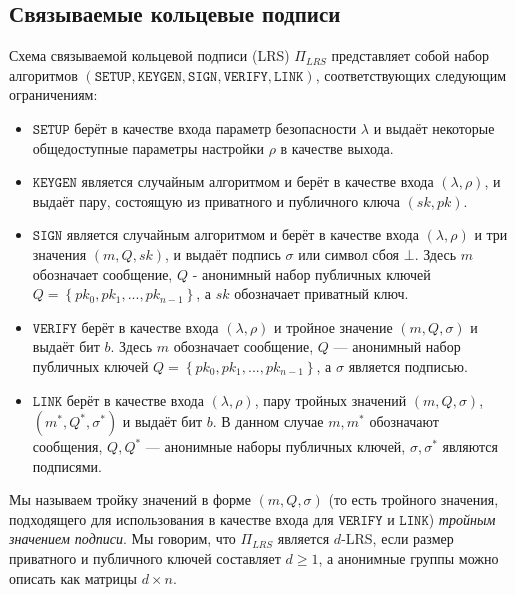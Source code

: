 \documentclass{llncs}
\begin{document}
\subsection{Связываемые кольцевые подписи}

\begin{definition}\label{def:lrs} Схема связываемой кольцевой подписи (LRS) $\Pi_{LRS}$ представляет собой набор алгоритмов $(\texttt{SETUP}, \texttt{KEYGEN}, \texttt{SIGN}, \texttt{VERIFY}, \texttt{LINK})$, соответствующих следующим ограничениям:
\begin{itemize}
\item $\texttt{SETUP}$ берёт в качестве входа параметр безопасности $\lambda$ и выдаёт некоторые общедоступные параметры настройки $\rho$ в качестве выхода.

\item $\texttt{KEYGEN}$ является случайным алгоритмом и берёт в качестве входа $(\lambda, \rho)$, и выдаёт пару, состоящую из приватного и публичного ключа $(sk, pk)$.

\item $\texttt{SIGN}$ является случайным алгоритмом и берёт в качестве входа $(\lambda, \rho)$ и три значения $(m, Q, sk)$, и выдаёт подпись $\sigma$ или символ сбоя $\bot$. Здесь $m$ обозначает сообщение, $Q$ - анонимный набор публичных ключей $Q = \left\{pk_0, pk_1, ..., pk_{n-1}\right\}$, а $sk$ обозначает приватный ключ.

\item $\texttt{VERIFY}$ берёт в качестве входа $(\lambda, \rho)$ и тройное значение $(m, Q, \sigma)$ и выдаёт бит $b$. Здесь $m$ обозначает сообщение, $Q$ — анонимный набор публичных ключей $Q = \left\{pk_0, pk_1, ..., pk_{n-1}\right\}$, а $\sigma$ является подписью.

\item $\texttt{LINK}$ берёт в качестве входа $(\lambda, \rho)$, пару тройных значений $(m, Q, \sigma)$, $(m^*, Q^*, \sigma^*)$ и выдаёт бит $b$. В данном случае $m, m^*$ обозначают сообщения, $Q, Q^*$ — анонимные наборы публичных ключей, $\sigma, \sigma^*$ являются подписями.
\end{itemize}
Мы называем тройку значений в форме $(m, Q, \sigma)$ (то есть тройного значения, подходящего для использования в качестве входа для $\texttt{VERIFY}$ и $\texttt{LINK}$) \textit{тройным значением подписи}. Мы говорим, что $\Pi_{LRS}$ является $d$-LRS, если размер приватного и публичного ключей составляет $d \geq 1$, а анонимные группы можно описать как матрицы $d\times n$.
\end{definition}
\end{document}
